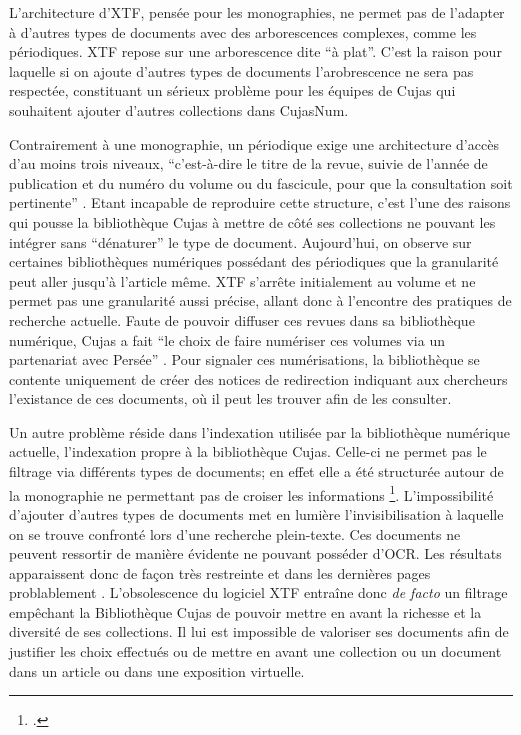 L'architecture d'\ac{XTF}, pensée pour les monographies, ne permet pas de l'adapter à d'autres types de documents avec des arborescences complexes, comme les périodiques. \ac{XTF} repose sur une arborescence dite \enquote{à plat}. C'est la raison pour laquelle si on ajoute d'autres types de documents l'arobrescence ne sera pas respectée, constituant un sérieux problème pour les équipes de Cujas qui souhaitent ajouter d'autres collections dans CujasNum.

Contrairement à une monographie, un périodique exige une architecture d'accès d'au moins trois niveaux, \enquote{c'est-à-dire le titre de la revue, suivie de l'année de publication et du numéro du volume ou du fascicule, pour que la consultation soit pertinente} . Etant incapable de reproduire cette structure, c'est l'une des raisons qui pousse la bibliothèque Cujas à mettre de côté ses collections ne pouvant les intégrer sans \enquote{dénaturer} le type de document. Aujourd'hui, on observe sur certaines bibliothèques numériques possédant des périodiques que la granularité peut aller jusqu'à l'article même. \ac{XTF} s'arrête initialement au volume et ne permet pas une granularité aussi précise, allant donc à l'encontre des pratiques de recherche actuelle. Faute de pouvoir diffuser ces revues dans sa bibliothèque numérique, Cujas a fait \enquote{le choix de faire numériser ces volumes via un partenariat avec Persée} . Pour signaler ces numérisations, la bibliothèque se contente uniquement de créer des notices de redirection indiquant aux chercheurs l'existance de ces documents, où il peut les trouver afin de les consulter. 

Un autre problème réside dans l'indexation utilisée par la bibliothèque numérique actuelle, l'indexation propre à la bibliothèque Cujas. Celle-ci ne permet pas le filtrage via différents types de documents; en effet elle a été structurée autour de la monographie ne permettant pas de croiser les informations \footcite{2013_Num_Indexation_manuel_FHdocEspaceTravail}. L'impossibilité d'ajouter d'autres types de documents met en lumière l'invisibilisation à laquelle on se trouve confronté lors d'une recherche plein-texte. Ces documents ne peuvent ressortir de manière évidente ne pouvant posséder d'\ac{OCR}. Les résultats apparaissent donc de façon très restreinte et dans les dernières pages problablement . L'obsolescence du logiciel \ac{XTF} entraîne donc \textit{de facto} un filtrage empêchant la Bibliothèque Cujas de pouvoir mettre en avant la richesse et la diversité de ses collections. Il lui est impossible de valoriser ses documents afin de justifier les choix effectués ou de mettre en avant une collection ou un document dans un article ou dans une exposition virtuelle. 
\medskip

